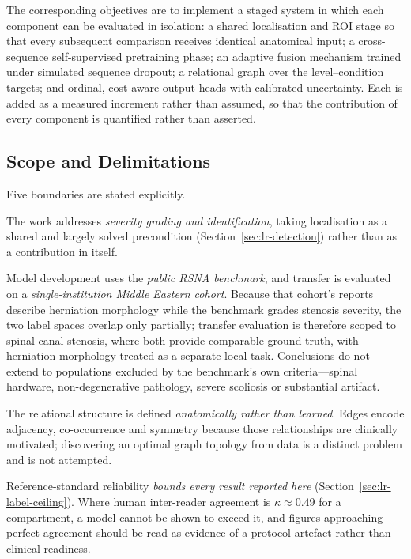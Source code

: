 The corresponding objectives are to implement a staged system in which each
component can be evaluated in isolation: a shared localisation and ROI stage so
that every subsequent comparison receives identical anatomical input; a
cross-sequence self-supervised pretraining phase; an adaptive fusion mechanism
trained under simulated sequence dropout; a relational graph over the
level--condition targets; and ordinal, cost-aware output heads with calibrated
uncertainty. Each is added as a measured increment rather than assumed, so that
the contribution of every component is quantified rather than asserted.

\subsection{Scope and Delimitations}
\label{sec:lr-scope-delimit}

Five boundaries are stated explicitly.

The work addresses \emph{severity grading and identification}, taking
localisation as a shared and largely solved precondition
(Section~\ref{sec:lr-detection}) rather than as a contribution in itself.

Model development uses the \emph{public RSNA benchmark}, and transfer is
evaluated on a \emph{single-institution Middle Eastern cohort}. Because that
cohort's reports describe herniation morphology while the benchmark grades
stenosis severity, the two label spaces overlap only partially; transfer
evaluation is therefore scoped to spinal canal stenosis, where both provide
comparable ground truth, with herniation morphology treated as a separate local
task. Conclusions do not extend to populations excluded by the benchmark's own
criteria---spinal hardware, non-degenerative pathology, severe scoliosis or
substantial artifact.

The relational structure is defined \emph{anatomically rather than learned}.
Edges encode adjacency, co-occurrence and symmetry because those relationships
are clinically motivated; discovering an optimal graph topology from data is a
distinct problem and is not attempted.

Reference-standard reliability \emph{bounds every result reported here}
(Section~\ref{sec:lr-label-ceiling}). Where human inter-reader agreement is
$\kappa \approx 0.49$ for a compartment, a model cannot be shown to exceed it,
and figures approaching perfect agreement should be read as evidence of a
protocol artefact rather than clinical readiness.

